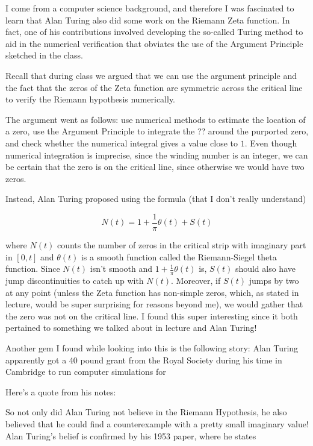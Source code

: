 \documentclass{article}
\theoremstyle{definition}
\begin{document}
I come from a computer science background, and therefore I was fascinated to learn
that Alan Turing also did some work on the Riemann Zeta function. In fact, one of
his contributions involved developing the so-called Turing method to aid in the
numerical verification that obviates the use of the Argument Principle sketched in
the class.

Recall that during class we argued that we can use the argument principle and the fact
that the zeros of the Zeta function are symmetric across the critical line to verify
the Riemann hypothesis numerically.

The argument went as follows: use numerical methods to estimate the location
of a zero, use the Argument Principle to integrate
the ?? around the purported zero, and check whether the numerical integral
gives a value close to $ 1 $. Even though numerical integration is imprecise,
since the winding number is an integer, we can be certain that the zero is on
the critical line, since otherwise we would have two zeros.

Instead, Alan Turing proposed using the formula (that I don't really understand)

\[ N(t) = 1 + \frac{1}{\pi} \theta(t) + S(t) \]

where $N(t)$ counts the number of zeros in the critical strip with imaginary part 
in $ [0,t] $ and  $ \theta(t) $ is a smooth function called the Riemann-Siegel theta function.
Since $ N(t) $ isn't smooth and $ 1 + \frac{1}{\pi} \theta(t) $ is, $ S(t) $ should 
also have jump discontinuities to catch up with $ N(t) $. Moreover, if $ S(t) $ jumps 
by two at any point (unless the Zeta function has non-simple zeros, which, as stated in lecture,
would be super surprising for reasons beyond me), we would gather that the zero was not on the
critical line. I found this super interesting since it both pertained to something we talked about
in lecture and Alan Turing!

Another gem I found while looking into this is the following story: 
Alan Turing apparently got a 40 pound grant from the Royal Society during his time
in Cambridge to run computer simulations for 

Here's a quote from his notes:


So not only did Alan Turing not believe in the Riemann Hypothesis, he also believed that he
could find a counterexample with a pretty small imaginary value! Alan Turing's belief is confirmed by his
1953 paper, where he states


 
\end{document}
